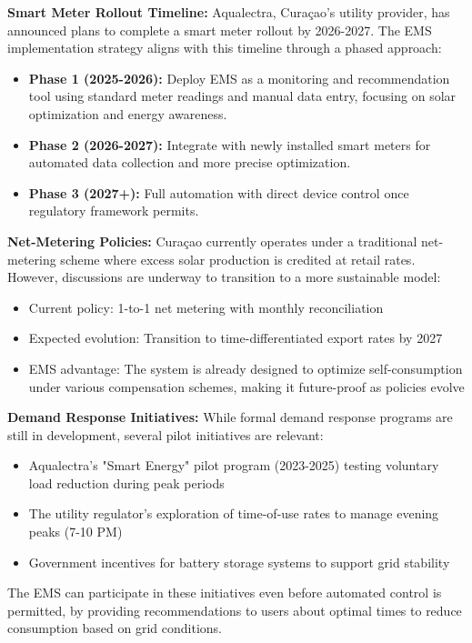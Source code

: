 \documentclass[12pt,a4paper]{article}
\begin{document}
\textbf{Smart Meter Rollout Timeline:} Aqualectra, Curaçao's utility provider, has announced plans to complete a smart meter rollout by 2026-2027. The EMS implementation strategy aligns with this timeline through a phased approach:
\begin{itemize}
    \item \textbf{Phase 1 (2025-2026):} Deploy EMS as a monitoring and recommendation tool using standard meter readings and manual data entry, focusing on solar optimization and energy awareness.
    \item \textbf{Phase 2 (2026-2027):} Integrate with newly installed smart meters for automated data collection and more precise optimization.
    \item \textbf{Phase 3 (2027+):} Full automation with direct device control once regulatory framework permits.
\end{itemize}

\textbf{Net-Metering Policies:} Curaçao currently operates under a traditional net-metering scheme where excess solar production is credited at retail rates. However, discussions are underway to transition to a more sustainable model:
\begin{itemize}
    \item Current policy: 1-to-1 net metering with monthly reconciliation
    \item Expected evolution: Transition to time-differentiated export rates by 2027
    \item EMS advantage: The system is already designed to optimize self-consumption under various compensation schemes, making it future-proof as policies evolve
\end{itemize}

\textbf{Demand Response Initiatives:} While formal demand response programs are still in development, several pilot initiatives are relevant:
\begin{itemize}
    \item Aqualectra's "Smart Energy" pilot program (2023-2025) testing voluntary load reduction during peak periods
    \item The utility regulator's exploration of time-of-use rates to manage evening peaks (7-10 PM)
    \item Government incentives for battery storage systems to support grid stability
\end{itemize}

The EMS can participate in these initiatives even before automated control is permitted, by providing recommendations to users about optimal times to reduce consumption based on grid conditions.
\end{document}
